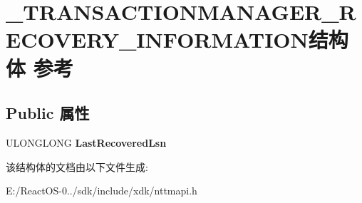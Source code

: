 \hypertarget{struct___t_r_a_n_s_a_c_t_i_o_n_m_a_n_a_g_e_r___r_e_c_o_v_e_r_y___i_n_f_o_r_m_a_t_i_o_n}{}\section{\+\_\+\+T\+R\+A\+N\+S\+A\+C\+T\+I\+O\+N\+M\+A\+N\+A\+G\+E\+R\+\_\+\+R\+E\+C\+O\+V\+E\+R\+Y\+\_\+\+I\+N\+F\+O\+R\+M\+A\+T\+I\+O\+N结构体 参考}
\label{struct___t_r_a_n_s_a_c_t_i_o_n_m_a_n_a_g_e_r___r_e_c_o_v_e_r_y___i_n_f_o_r_m_a_t_i_o_n}
\subsection*{Public 属性}
\begin{DoxyCompactItemize}
\item 
\mbox{\label{struct___t_r_a_n_s_a_c_t_i_o_n_m_a_n_a_g_e_r___r_e_c_o_v_e_r_y___i_n_f_o_r_m_a_t_i_o_n_ac0cdfdea2cb1fc2ebb98b3470483ff2d}} 
U\+L\+O\+N\+G\+L\+O\+NG {\bfseries Last\+Recovered\+Lsn}
\end{DoxyCompactItemize}


该结构体的文档由以下文件生成\+:\begin{DoxyCompactItemize}
\item 
E\+:/\+React\+O\+S-\/0../sdk/include/xdk/nttmapi.\+h\end{DoxyCompactItemize}
